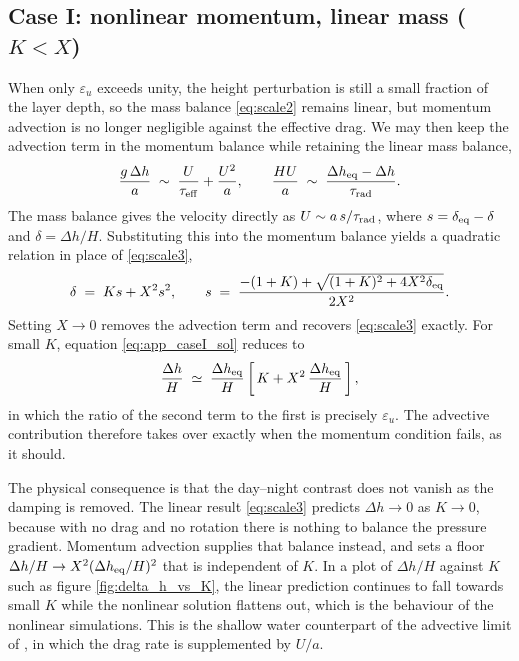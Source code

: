 \documentclass[trackchanges,twocolumn]{aastex7}
\begin{document}
\subsection{Case I: nonlinear momentum, linear mass ($K < X$)}
\label{sec:app_caseI}

When only $\varepsilon_u$ exceeds unity, the height perturbation is still a small fraction of
the layer depth, so the mass balance \eqref{eq:scale2} remains linear, but momentum advection
is no longer negligible against the effective drag. We may then keep the advection term in the
momentum balance while retaining the linear mass balance,
\begin{equation}
    \frac{g\,\Delta h}{a} \;\sim\; \frac{U}{\tau_{\rm eff}} + \frac{U^{2}}{a},
    \qquad
    \frac{HU}{a} \;\sim\; \frac{\Delta h_{\rm eq} - \Delta h}{\tau_{\rm rad}} .
    \label{eq:app_caseI_bal}
\end{equation}
The mass balance gives the velocity directly as $U \sim a\,s/\tau_{\rm rad}$, where
$s = \delta_{\rm eq} - \delta$ and $\delta = \Delta h/H$. Substituting this into the momentum
balance yields a quadratic relation in place of \eqref{eq:scale3},
\begin{equation}
    \delta \;=\; K s + X^{2} s^{2},
    \qquad
    s \;=\; \frac{-(1+K) + \sqrt{(1+K)^{2} + 4X^{2}\delta_{\rm eq}}}{2X^{2}} .
    \label{eq:app_caseI_sol}
\end{equation}
Setting $X \to 0$ removes the advection term and recovers \eqref{eq:scale3} exactly. For small
$K$, equation \eqref{eq:app_caseI_sol} reduces to
\begin{equation}
    \frac{\Delta h}{H} \;\simeq\; \frac{\Delta h_{\rm eq}}{H}
    \left[\,K + X^{2}\,\frac{\Delta h_{\rm eq}}{H}\,\right],
    \label{eq:app_caseI_lowK}
\end{equation}
in which the ratio of the second term to the first is precisely $\varepsilon_u$. The advective
contribution therefore takes over exactly when the momentum condition fails, as it should.

The physical consequence is that the day--night contrast does not vanish as the damping is
removed. The linear result \eqref{eq:scale3} predicts $\Delta h \to 0$ as $K \to 0$, because
with no drag and no rotation there is nothing to balance the pressure gradient. Momentum
advection supplies that balance instead, and sets a floor
$\Delta h/H \to X^{2}(\Delta h_{\rm eq}/H)^{2}$ that is independent of $K$. In a plot of
$\Delta h/H$ against $K$ such as figure \ref{fig:delta_h_vs_K}, the linear prediction continues
to fall towards small $K$ while the nonlinear solution flattens out, which is the behaviour of
the nonlinear simulations. This is the shallow water counterpart of the advective limit of
\citet{komacek2016atmospheric}, in which the drag rate is supplemented by $U/a$.
\end{document}
